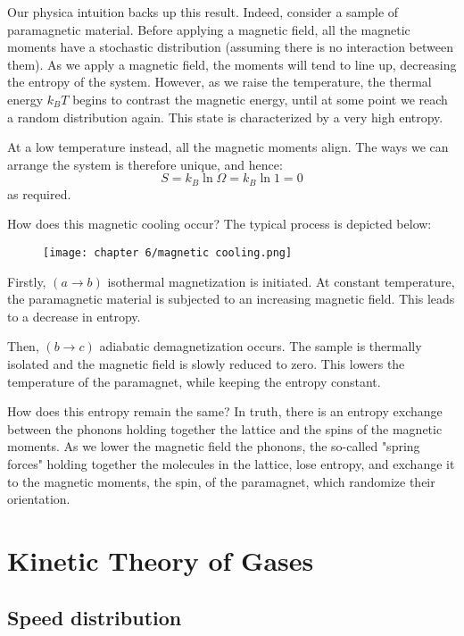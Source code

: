 \documentclass[a4paper,11pt,oneside]{book}
\begin{document}
Our physica intuition backs up this result. Indeed, consider a sample of paramagnetic material. Before applying a magnetic field, all the magnetic moments have a stochastic distribution (assuming there is no interaction between them). As we apply a magnetic field, the moments will tend to line up, decreasing the entropy of the system. However, as we raise the temperature, the thermal energy $k_B T$ begins to contrast the magnetic energy, until at some point we reach a random distribution again. This state is characterized by a very high entropy. 


At a low temperature instead, all the magnetic moments align. The ways we can arrange the system is therefore unique, and hence:
\begin{equation}
    S=k_B \ln \Omega = k_B \ln 1 = 0
\end{equation}
as required. 


How does this magnetic cooling occur? The typical process is depicted below:
\begin{figure}[h!]
    \centering
    \texttt{[image: chapter 6/magnetic cooling.png]}
    \label{fig:my_label}
\end{figure}


Firstly, $(a \rightarrow b)$ isothermal magnetization is initiated. At constant temperature, the paramagnetic material is subjected to an increasing magnetic field. This leads to a decrease in entropy. 

Then, $(b \rightarrow c)$ adiabatic demagnetization occurs. The sample is thermally isolated and the magnetic field is slowly reduced to zero. This lowers the temperature of the paramagnet, while keeping the entropy constant. 


How does this entropy remain the same? In truth, there is an entropy exchange between the phonons holding together the lattice and the spins of the magnetic moments. 
As we lower the magnetic field the phonons, the so-called "spring forces" holding together the molecules in the lattice, lose entropy, and exchange it to the magnetic moments, the spin, of the paramagnet, which randomize their orientation. 



\part{Kinetic Theory of Gases}

\chapter{Speed distribution}
\end{document}
